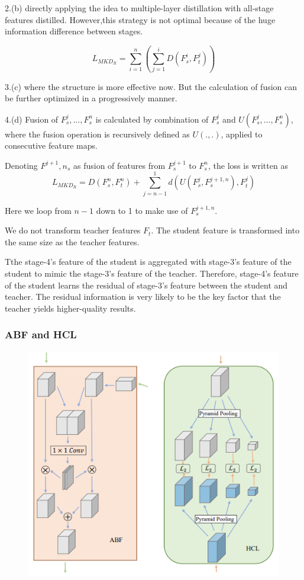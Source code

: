 \documentclass[11pt]{article}
\begin{document}
2.(b) directly applying the idea to multiple-layer distillation with all-stage features distilled. However,this strategy is not optimal because of the huge information difference between stages.

$$L_{MKD_R} = \sum_{i=1}^{n}(\sum_{j=1}^{i}D(F_s^i,F_t^j))$$

3.(c) where the structure is more effective now. But the calculation of fusion can be further optimized in a progressively manner.

4.(d) Fusion of $F^j_s,..., F^n_s$ is calculated by combination of $F_s^j$ and $U(F_s^j,...,F_s^n)$, where the fusion operation is recursively defined as $U(.,.)$, applied to consecutive feature maps.

Denoting $F^{j+1},n_s$ as fusion of features from $F^{j+1}_s$ to $F^n_s$, the loss is written as 
$$L_{MKD_R} =D(F^n_s,F^n_t)+\sum_{j=n-1}^{1}d(U(F_s^j,F_s^{j+1,n}),F_t^j)$$

Here we loop from $n-1$ down to 1 to make use of $F_s^{j+1,n}$.

We do not transform teacher features $F_t$. The student feature is transformed into the same size as the teacher features.

Tthe stage-4’s feature of the student is aggregated with stage-3’s feature of the student to mimic the stage-3’s feature of the teacher. Therefore, stage-4’s feature of the student learns the residual of stage-3’s feature between the student and teacher. The residual information is very likely to be the key factor that the teacher yields higher-quality results.

\subsubsection{ABF and HCL}
\begin{figure}[H]
	\centering
	\includegraphics[scale = 0.65]{101}
\end{figure}
\end{document}
